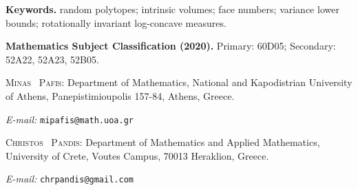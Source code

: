 \documentclass[10pt]{amsart}
\newcommand{\1}{\textbf{1}}
\numberwithin{equation}{section} %
\theoremstyle{remark}
\theoremstyle{definition}
\begin{document}
\small

\bigskip


\noindent\textbf{Keywords.}
random polytopes; intrinsic volumes; face numbers; variance lower bounds;
rotationally invariant log-concave measures.

\noindent\textbf{Mathematics Subject Classification (2020).}
Primary: 60D05; Secondary: 52A22, 52A23, 52B05.


\bigskip

\bigskip


\noindent \textsc{Minas \ Pafis}: Department of Mathematics, National and Kapodistrian University of Athens, Panepistimioupolis 157-84,
Athens, Greece.

\smallskip

\noindent \textit{E-mail:} \texttt{mipafis@math.uoa.gr}

\bigskip

\noindent \textsc{Christos \ Pandis}: Department of Mathematics and Applied Mathematics, University of Crete, Voutes Campus, 70013 Heraklion, Greece.

\smallskip

\noindent \textit{E-mail:} \texttt{chrpandis@gmail.com}
\end{document}
